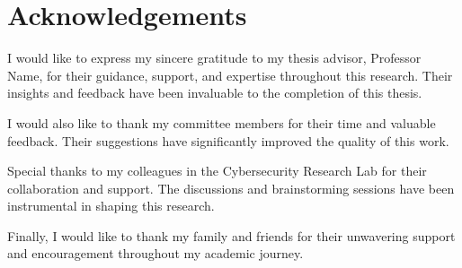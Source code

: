 \chapter*{Acknowledgements}

I would like to express my sincere gratitude to my thesis advisor, Professor Name, for their guidance, support, and expertise throughout this research. Their insights and feedback have been invaluable to the completion of this thesis.

I would also like to thank my committee members for their time and valuable feedback. Their suggestions have significantly improved the quality of this work.

Special thanks to my colleagues in the Cybersecurity Research Lab for their collaboration and support. The discussions and brainstorming sessions have been instrumental in shaping this research.

Finally, I would like to thank my family and friends for their unwavering support and encouragement throughout my academic journey. 